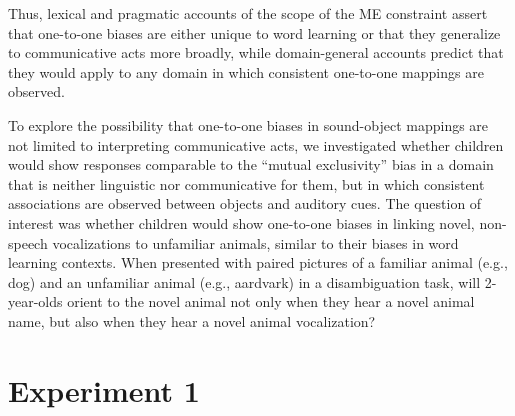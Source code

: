 \documentclass[english,floatsintext,man]{apa6}
\theoremstyle{definition}
\theoremstyle{definition}
\theoremstyle{definition}
\theoremstyle{remark}
\begin{document}
Thus, lexical and pragmatic accounts of the scope of the ME constraint
assert that one-to-one biases are either unique to word learning or that
they generalize to communicative acts more broadly, while domain-general
accounts predict that they would apply to any domain in which consistent
one-to-one mappings are observed.

To explore the possibility that one-to-one biases in sound-object
mappings are not limited to interpreting communicative acts, we
investigated whether children would show responses comparable to the
\enquote{mutual exclusivity} bias in a domain that is neither linguistic
nor communicative for them, but in which consistent associations are
observed between objects and auditory cues. The question of interest was
whether children would show one-to-one biases in linking novel,
non-speech vocalizations to unfamiliar animals, similar to their biases
in word learning contexts. When presented with paired pictures of a
familiar animal (e.g., dog) and an unfamiliar animal (e.g., aardvark) in
a disambiguation task, will 2-year-olds orient to the novel animal not
only when they hear a novel animal name, but also when they hear a novel
animal vocalization?

\section{Experiment 1}\label{experiment-1}
\end{document}
